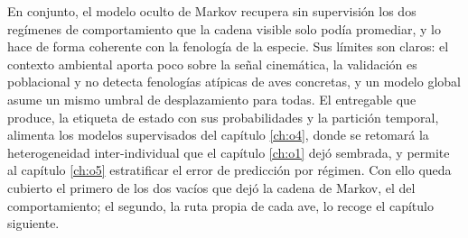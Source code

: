 En conjunto, el modelo oculto de Markov recupera sin supervisión los dos regímenes de
comportamiento que la cadena visible solo podía promediar, y lo hace de forma coherente
con la fenología de la especie. Sus límites son claros: el contexto ambiental aporta poco
sobre la señal cinemática, la validación es poblacional y no detecta fenologías atípicas
de aves concretas, y un modelo global asume un mismo umbral de desplazamiento para todas.
El entregable que produce, la etiqueta de estado con sus probabilidades y la partición
temporal, alimenta los modelos supervisados del capítulo \ref{ch:o4}, donde se retomará
la heterogeneidad inter-individual que el capítulo \ref{ch:o1} dejó sembrada, y permite
al capítulo \ref{ch:o5} estratificar el error de predicción por régimen. Con ello queda cubierto el primero de los dos vacíos que dejó
la cadena de Markov, el del comportamiento; el segundo, la ruta propia de cada ave, lo
recoge el capítulo siguiente.
